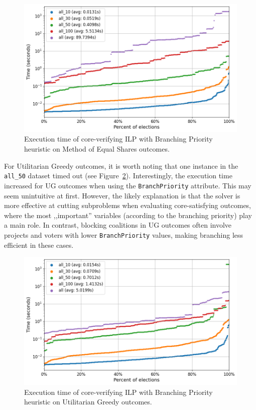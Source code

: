 \documentclass[magisterska,en]{pracamgr}
\newcommand\chartsize{0.94}
\begin{document}
\begin{figure}[h!]
    \centering
    \includegraphics[width=\chartsize\linewidth]{outputs/BranchingPriority/mes.png}
    \caption{Execution time of core-verifying ILP with Branching Priority heuristic on Method of Equal Shares outcomes.}
    \label{branching-priority-mes}
\end{figure}

For Utilitarian Greedy outcomes, it is worth noting that one instance in the \texttt{all\_50} dataset timed out (see Figure~\ref{branching-priority-greedy}). Interestingly, the execution time increased for UG outcomes when using the \texttt{BranchPriority} attribute. This may seem unintuitive at first. However, the likely explanation is that the solver is more effective at cutting subproblems when evaluating core-satisfying outcomes, where the most ,,important'' variables (according to the branching priority) play a main role. In contrast, blocking coalitions in UG outcomes often involve projects and voters with lower \texttt{BranchPriority} values, making branching less efficient in these cases.

\begin{figure}[h!]
    \centering
    \includegraphics[width=\chartsize\linewidth]{outputs/BranchingPriority/greedy.png}
    \caption{Execution time of core-verifying ILP with Branching Priority heuristic on Utilitarian Greedy outcomes.}
    \label{branching-priority-greedy}
\end{figure}
\end{document}
